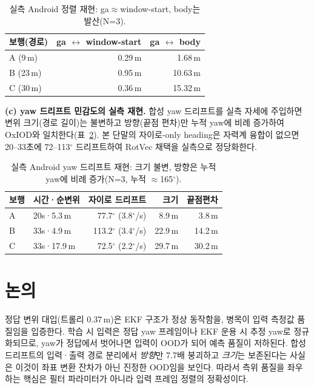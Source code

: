 \documentclass{kcc}
\begin{document}
\begin{table}[!htb]
\caption{실측 Android 정렬 재현: ga$\approx$window-start, body는 발산(N=3).}
\label{tab:android-align}
\centering\footnotesize
\begin{tabular}{@{}lrr@{}}
\toprule
보행(경로) & ga $\leftrightarrow$ window-start & ga $\leftrightarrow$ body \\ \midrule
A (9\,m) & 0.29\,m & 1.68\,m \\
B (23\,m) & 0.95\,m & 10.63\,m \\
C (30\,m) & 0.36\,m & 15.32\,m \\ \bottomrule
\end{tabular}
\end{table}

\noindent\textbf{(c) yaw 드리프트 민감도의 실측 재현.} 합성 yaw 드리프트를 실측 자세에 주입하면 변위 크기(경로 길이)는 불변하고 방향(끝점 편차)만 누적 yaw에 비례 증가하여 OxIOD와 일치한다(표~\ref{tab:android-yaw}). 본 단말의 자이로-only heading은 자력계 융합이 없으면 20--33초에 72--113$^\circ$ 드리프트하여 RotVec 채택을 실측으로 정당화한다.

\begin{table}[!htb]
\caption{실측 Android yaw 드리프트 재현: 크기 불변, 방향은 누적 yaw에 비례 증가(N=3, 누적 $\approx$165$^\circ$).}
\label{tab:android-yaw}
\centering\footnotesize
\begin{tabular}{@{}llrrr@{}}
\toprule
보행 & 시간·순변위 & 자이로 드리프트 & 크기 & 끝점편차 \\ \midrule
A & 20s·5.3\,m & 77.7$^\circ$ (3.8$^\circ$/s) & 8.9\,m & 3.8\,m \\
B & 33s·4.9\,m & 113.2$^\circ$ (3.4$^\circ$/s) & 22.9\,m & 14.2\,m \\
C & 33s·17.9\,m & 72.5$^\circ$ (2.2$^\circ$/s) & 29.7\,m & 30.2\,m \\ \bottomrule
\end{tabular}
\end{table}

\section{논의}
정답 변위 대입(트롤리 0.37\,m)은 EKF 구조가 정상 동작함을, 병목이 입력 측정값 품질임을 입증한다. 학습 시 입력은 정답 yaw 프레임이나 EKF 운용 시 추정 yaw로 정규화되므로, yaw가 정답에서 벗어나면 입력이 OOD가 되어 예측 품질이 저하된다. 합성 드리프트의 입력·출력 경로 분리에서 \emph{방향}만 7.7배 붕괴하고 \emph{크기}는 보존된다는 사실은 이것이 좌표 변환 잔차가 아닌 진정한 OOD임을 보인다. 따라서 측위 품질을 좌우하는 핵심은 필터 파라미터가 아니라 입력 프레임 정렬의 정확성이다.
\end{document}
